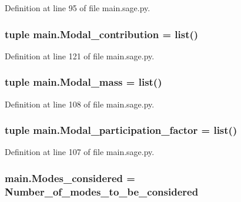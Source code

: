 Definition at line 95 of file main.\+sage.\+py.

\hypertarget{namespacemain_ae8c706be82800a75da37e5da67018f90}{}
\subsubsection[{Modal\+\_\+contribution}]{\setlength{\rightskip}{0pt plus 5cm}tuple main.\+Modal\+\_\+contribution = list()}\label{namespacemain_ae8c706be82800a75da37e5da67018f90}


Definition at line 121 of file main.\+sage.\+py.

\hypertarget{namespacemain_ac7e5d737af53772a131628449c0e6477}{}
\subsubsection[{Modal\+\_\+mass}]{\setlength{\rightskip}{0pt plus 5cm}tuple main.\+Modal\+\_\+mass = list()}\label{namespacemain_ac7e5d737af53772a131628449c0e6477}


Definition at line 108 of file main.\+sage.\+py.

\hypertarget{namespacemain_a4ad22e0a1336b0e665ff865d68f4fcc1}{}
\subsubsection[{Modal\+\_\+participation\+\_\+factor}]{\setlength{\rightskip}{0pt plus 5cm}tuple main.\+Modal\+\_\+participation\+\_\+factor = list()}\label{namespacemain_a4ad22e0a1336b0e665ff865d68f4fcc1}


Definition at line 107 of file main.\+sage.\+py.

\hypertarget{namespacemain_a9d22ac077c22a97b1b095068a1500d16}{}
\subsubsection[{Modes\+\_\+considered}]{\setlength{\rightskip}{0pt plus 5cm}main.\+Modes\+\_\+considered = Number\+\_\+of\+\_\+modes\+\_\+to\+\_\+be\+\_\+considered}\label{namespacemain_a9d22ac077c22a97b1b095068a1500d16}


